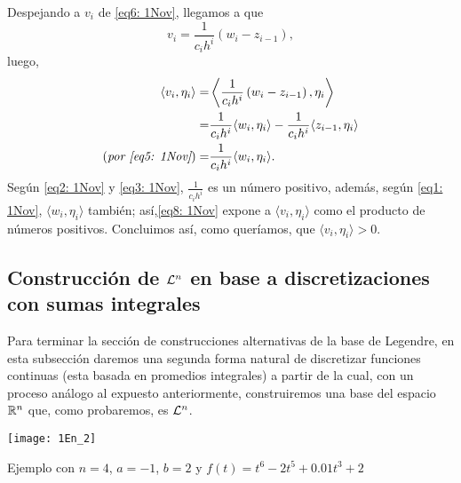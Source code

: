 \begin{itemize}
Despejando a $v_{i}$ de \eqref{eq6: 1Nov}, llegamos a que
\begin{equation}
\label{eq7: 1Nov}
v_{i}= \frac{1}{c_{i}h^{i}} \left( w_{i} -  z_{i-1} \right),
\end{equation}
luego,
\begin{align}
\label{eq8: 1Nov}
\left\langle v_{i}, \eta_{i} \right\rangle = & 
\left\langle \frac{1}{c_{i}h^{i}} \left( w_{i} -  z_{i-1} \right), \eta_{i} 
 \right\rangle \nonumber \\
= & \frac{1}{c_{i}h^{i}} \langle w_{i}, \eta_{i} \rangle -
\frac{1}{c_{i}h^{i}} \langle z_{i-1}, \eta_{i} \rangle \nonumber \\
(\textit{por \eqref{eq5: 1Nov}}) = & \frac{1}{c_{i}h^{i}} \langle w_{i}, \eta_{i} \rangle.
\end{align}
Según 
\eqref{eq2: 1Nov} y 
\eqref{eq3: 1Nov}, $\frac{1}{c_{i}h^{i}}$ es
un número positivo, además, según 
\eqref{eq1: 1Nov}, $\langle w_{i}, \eta_{i} \rangle$ también;
así,\eqref{eq8: 1Nov} expone a $\langle v_{i}, \eta_{i} \rangle$
como el producto de números positivos. 
Concluimos así, como queríamos,
que $\langle v_{i}, \eta_{i} \rangle>0$.
\QEDB
\vspace{0.2cm}


\end{itemize}

\subsection{Construcción de $\mathcal{L}^{n}$ en base a discretizaciones con sumas integrales}
\label{Construcción de Ln en base a discretizaciones con sumas integrales}
Para terminar la sección de construcciones alternativas
de la base de Legendre,
en esta subsección daremos una segunda
forma natural de discretizar funciones continuas
(esta basada en promedios integrales) a partir de 
la cual, con un proceso análogo al expuesto
anteriormente,
construiremos una base del espacio $\mathbb{R}^{n}$
que, como probaremos, es $\mathcal{L}^{n}$.

\begin{marginfigure}
\texttt{[image: 1En\_2]} 
		\caption{Ejemplo con $n=4$, $a=-1$, $b=2$ y
		$f(t)= t^{6}-2t^{5}+0.01t^{3}+2$}
\end{marginfigure}



